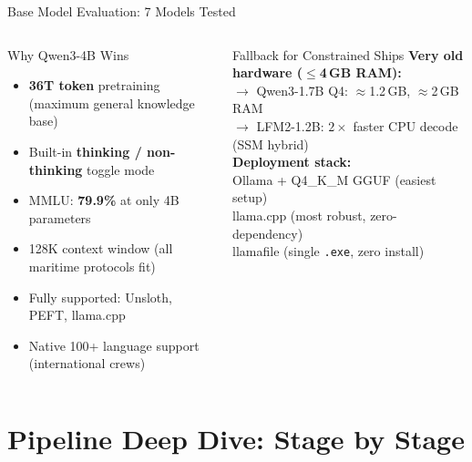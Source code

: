\documentclass[aspectratio=169,11pt]{beamer}
\begin{document}
\begin{frame}[shrink=15]{Base Model Evaluation: 7 Models Tested}
\vspace{4pt}
\begin{columns}[T]
\begin{block}{Why Qwen3-4B Wins}
  \scriptsize
  \begin{itemize}\setlength\itemsep{1pt}
    \item \textbf{36T token} pretraining (maximum general knowledge base)
    \item Built-in \textbf{thinking / non-thinking} toggle mode
    \item MMLU: \textbf{79.9\%} at only 4B parameters
    \item 128K context window (all maritime protocols fit)
    \item Fully supported: Unsloth, PEFT, llama.cpp
    \item Native 100+ language support (international crews)
  \end{itemize}
\end{block}
\begin{block}{Fallback for Constrained Ships}
  \scriptsize\RaggedRight
  \textbf{Very old hardware ($\leq$4\,GB RAM):}\\
  $\to$ Qwen3-1.7B Q4: $\approx$1.2\,GB, $\approx$2\,GB RAM\\
  $\to$ LFM2-1.2B: $2\times$ faster CPU decode (SSM hybrid)\\[4pt]
  \textbf{Deployment stack:}\\
  Ollama + Q4\_K\_M GGUF (easiest setup)\\
  llama.cpp (most robust, zero-dependency)\\
  llamafile (single \texttt{.exe}, zero install)
\end{block}
\end{columns}
\end{frame}

\section{Pipeline Deep Dive: Stage by Stage}
\end{document}
